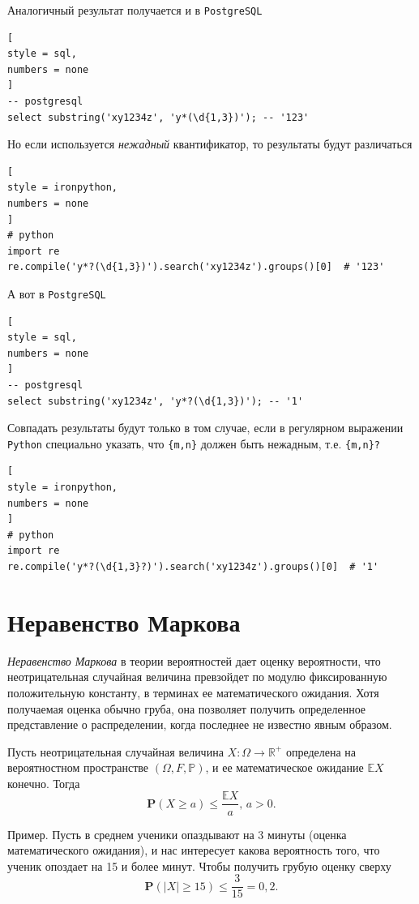 \documentclass[%
	11pt,
	a4paper,
	utf8,
		]{article}
\begin{document}
Аналогичный результат получается и в \texttt{PostgreSQL}
\begin{lstlisting}[
style = sql,
numbers = none
]
-- postgresql
select substring('xy1234z', 'y*(\d{1,3})'); -- '123'
\end{lstlisting}

Но если используется \emph{нежадный} квантификатор, то результаты будут различаться
\begin{lstlisting}[
style = ironpython,
numbers = none
]
# python
import re
re.compile('y*?(\d{1,3})').search('xy1234z').groups()[0]  # '123'
\end{lstlisting}

А вот в \texttt{PostgreSQL}
\begin{lstlisting}[
style = sql,
numbers = none
]
-- postgresql
select substring('xy1234z', 'y*?(\d{1,3})'); -- '1'
\end{lstlisting}

Совпадать результаты будут только в том случае, если в регулярном выражении \texttt{Python} специально указать, что \verb|{m,n}| должен быть нежадным, т.е. \verb|{m,n}?|
\begin{lstlisting}[
style = ironpython,
numbers = none
]
# python
import re
re.compile('y*?(\d{1,3}?)').search('xy1234z').groups()[0]  # '1'
\end{lstlisting}

\section{Неравенство Маркова}

\emph{Неравенство Маркова} в теории вероятностей дает оценку вероятности, что неотрицательная случайная величина превзойдет по модулю фиксированную положительную константу, в терминах ее математического ожидания. Хотя получаемая оценка обычно груба, она позволяет получить определенное представление о распределении, когда последнее не известно явным образом.

Пусть неотрицательная случайная величина $ X: \Omega \to \mathbb{R}^+ $ определена на вероятностном пространстве $ (\Omega, F, \mathbb{P}) $, и ее математическое ожидание $ \mathbb{E}X $ конечно. Тогда
$$
\mathbf{P}(X \geqslant a) \leqslant \dfrac{\mathbb{E}X}{a}, \, a > 0.
$$

Пример. Пусть в среднем ученики опаздывают на 3 минуты (оценка математического ожидания), и нас интересует какова вероятность того, что ученик опоздает на 15 и более минут. Чтобы получить грубую оценку сверху
$$
\mathbf{P}(|X| \geqslant 15) \leqslant \dfrac{3}{15} = 0,2.
$$
\end{document}
